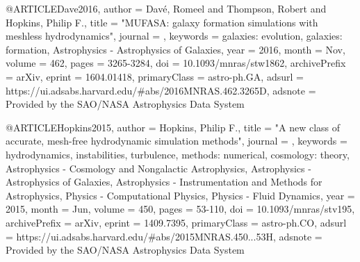 @ARTICLE{Dave2016,
       author = {{Dav{\'e}}, Romeel and {Thompson}, Robert and {Hopkins}, Philip F.},
        title = "{MUFASA: galaxy formation simulations with meshless hydrodynamics}",
      journal = {\mnras},
     keywords = {galaxies: evolution, galaxies: formation, Astrophysics - Astrophysics of Galaxies},
         year = 2016,
        month = Nov,
       volume = {462},
        pages = {3265-3284},
          doi = {10.1093/mnras/stw1862},
archivePrefix = {arXiv},
       eprint = {1604.01418},
 primaryClass = {astro-ph.GA},
       adsurl = {https://ui.adsabs.harvard.edu/\#abs/2016MNRAS.462.3265D},
      adsnote = {Provided by the SAO/NASA Astrophysics Data System}
}

@ARTICLE{Hopkins2015,
       author = {{Hopkins}, Philip F.},
        title = "{A new class of accurate, mesh-free hydrodynamic simulation methods}",
      journal = {\mnras},
     keywords = {hydrodynamics, instabilities, turbulence, methods: numerical, cosmology: theory, Astrophysics - Cosmology and Nongalactic Astrophysics, Astrophysics - Astrophysics of Galaxies, Astrophysics - Instrumentation and Methods for Astrophysics, Physics - Computational Physics, Physics - Fluid Dynamics},
         year = 2015,
        month = Jun,
       volume = {450},
        pages = {53-110},
          doi = {10.1093/mnras/stv195},
archivePrefix = {arXiv},
       eprint = {1409.7395},
 primaryClass = {astro-ph.CO},
       adsurl = {https://ui.adsabs.harvard.edu/\#abs/2015MNRAS.450...53H},
      adsnote = {Provided by the SAO/NASA Astrophysics Data System}
}

